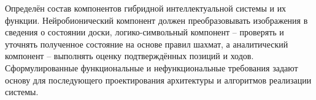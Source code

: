Определён состав компонентов гибридной интеллектуальной системы и их функции. Нейробионический компонент должен преобразовывать изображения в сведения о состоянии доски, логико-символьный компонент -- проверять и уточнять полученное состояние на основе правил шахмат, а аналитический компонент -- выполнять оценку подтверждённых позиций и ходов. Сформулированные функциональные и нефункциональные требования задают основу для последующего проектирования архитектуры и алгоритмов реализации системы.
